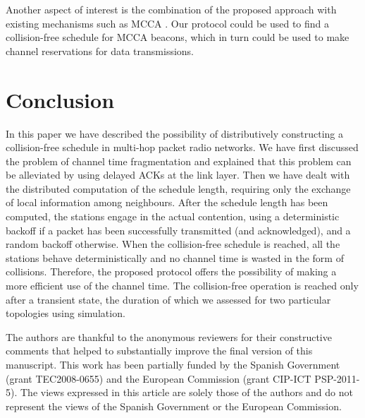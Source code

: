 \documentclass[twocolumn]{svjour3}          \smartqed  \usepackage{graphicx}
\begin{document}
Another aspect of interest is the combination of the proposed approach with existing mechanisms such as MCCA \cite{hiertz2010wms}.
Our protocol could be used to find a collision-free schedule for MCCA beacons, which in turn could be used to make channel reservations for data transmissions.




\section{Conclusion}
\label{sec:conclusion}

In this paper we have described the possibility of distributively constructing a collision-free schedule in multi-hop packet radio networks.
We have first discussed the problem of channel time fragmentation and explained that this problem can be alleviated by using delayed ACKs at the link layer.
Then we have dealt with the distributed computation of the schedule length, requiring only the exchange of local information among neighbours.
After the schedule length has been computed, the stations engage in the actual contention, using a deterministic backoff if a packet has been successfully transmitted (and acknowledged), and a random backoff otherwise.
When the collision-free schedule is reached, all the stations behave deterministically and no channel time is wasted in the form of collisions.
Therefore, the proposed protocol offers the possibility of making a more efficient use of the channel time.
The collision-free operation is reached only after a transient state, the duration of which we assessed for two particular topologies using simulation.




\begin{acknowledgements}
The authors are thankful to the anonymous reviewers for their constructive comments that helped to substantially improve the final version of this manuscript.
This work has been partially funded by the Spanish Government (grant TEC2008-0655) and the European Commission (grant CIP-ICT PSP-2011-5).
The views expressed in this article are solely those of the authors and do not represent the views of the Spanish Government or the European Commission.
\end{acknowledgements}

         
\end{document}
